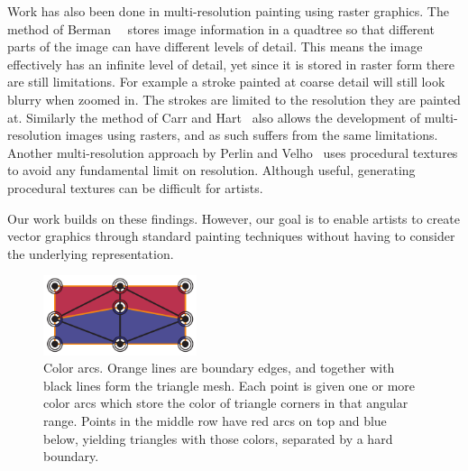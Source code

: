 \documentclass[conference]{acmsiggraph}
\begin{document}
Work has also been done in multi-resolution painting using raster graphics. 
The method of Berman~\etal~
stores image information in a quadtree so that different parts of the image can have different levels of detail.
This means the image effectively has an infinite level of detail, yet since it is stored in raster form
there are still limitations. For example a stroke painted at coarse detail will still look blurry when
zoomed in. The strokes are limited to the resolution they are painted at. Similarly the method of Carr and Hart~
also allows the development of multi-resolution images using rasters, and as such suffers from the
same limitations.  Another multi-resolution approach by Perlin and Velho~ uses
procedural textures to avoid any fundamental limit on resolution. Although useful,
generating procedural textures can be difficult for artists.

Our work builds on these findings. However, our goal is to enable artists to create vector
graphics through standard painting techniques without having to consider the underlying representation.

\begin{figure}
    \centering
        \includegraphics[width=0.4\textwidth]{images/colorarcsfinal}
    \caption{Color arcs. Orange lines are boundary edges, and together with black lines form the triangle
    mesh. Each point is given one or more color arcs 
    which store the color of triangle corners in that angular range.
    Points in the middle row have red arcs on top and blue below,
    yielding triangles with those colors, separated by a hard boundary.}
    \label{fig:arcs}
\end{figure}
\end{document}
